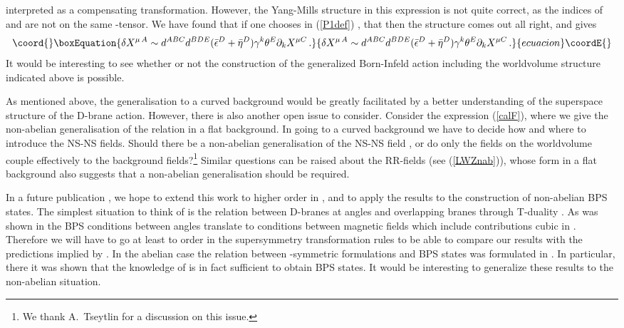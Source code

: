 \documentclass[12pt,a4paper]{article}
\begin{document}
interpreted as a compensating transformation. However, the Yang-Mills
structure in this expression is not quite correct, as the indices of \coordHE{}
and \coordHE{} are not on the same \coordHE{}-tensor. We have found that if one chooses
in (\ref{P1def}) \coordHE{}, that then the structure comes out all right, and
gives
\begin{equation}\coord{}\boxEquation{
   \delta X^{\mu\,A} \sim d^{ABC}d^{BDE} (\bar\epsilon^D + \bar\eta^D)
        \gamma^k\theta^E\partial_k X^{\mu C}\,.
}{
   \delta X^{\mu\,A} \sim d^{ABC}d^{BDE} (\bar\epsilon^D + \bar\eta^D)
        \gamma^k\theta^E\partial_k X^{\mu C}\,.
}{ecuacion}\coordE{}\end{equation}
It would be interesting to see whether or not the construction of
the generalized Born-Infeld action including the worldvolume
structure indicated above is possible.

As mentioned above, the generalisation to a curved background would be
greatly facilitated by a better understanding of the superspace
structure of the D-brane action. However, there is also another
open issue to consider. Consider
the expression (\ref{calF}), where we give the non-abelian
generalisation of the relation \coordHE{} in a flat
background. In going to a curved background we have to decide
how and where to introduce the NS-NS fields. Should there
be a non-abelian generalisation of the NS-NS field \coordHE{}, or
do only the \coordHE{} fields on the worldvolume
couple effectively to the background
fields?\footnote{We thank A.~Tseytlin for a discussion on this issue.}
 Similar questions can be raised about the RR-fields
(see (\ref{LWZnab})),
whose form in a flat background also suggests that a non-abelian
generalisation should be required.

In a future publication \cite{BRS2}, we hope to extend this work to
higher order in \coordHE{}, and to apply the results to the
construction of non-abelian BPS states. The simplest
situation to think of is the relation
between  D-branes at angles \cite{BDL} and  overlapping
branes through T-duality \cite{HT}. As was shown in
\cite{DST} the BPS conditions between angles translate to
conditions between magnetic fields \coordHE{} which include
contributions cubic in \coordHE{}. Therefore we will have to go at least to
order \coordHE{} in the supersymmetry transformation rules to
be able to compare our results with the predictions implied by
\cite{BDL}. In the abelian case the relation between
\myHighlight{$\kappa$}\coordHE{}-symmetric formulations and BPS states was
formulated in \cite{BKOP}. In particular, there it was shown that
the knowledge of \myHighlight{$\Gamma$}\coordHE{} is in fact sufficient to obtain
BPS states. It would be interesting to generalize these results
to the non-abelian situation.
\end{document}
